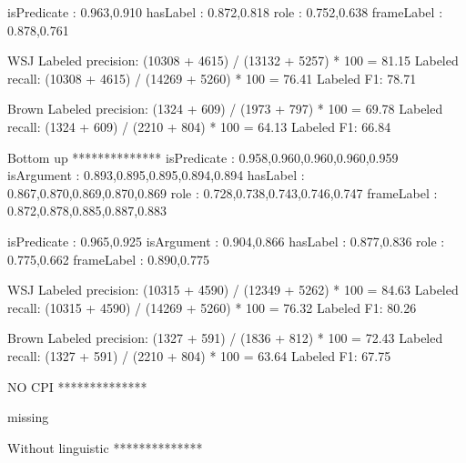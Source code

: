          isPredicate    : 0.963,0.910
            hasLabel    : 0.872,0.818
                role    : 0.752,0.638
          frameLabel    : 0.878,0.761

WSJ
  Labeled precision:          (10308 + 4615) / (13132 + 5257) * 100 = 81.15 %
  Labeled recall:             (10308 + 4615) / (14269 + 5260) * 100 = 76.41 %
  Labeled F1:                 78.71

Brown
  Labeled precision:          (1324 + 609) / (1973 + 797) * 100 = 69.78 %
  Labeled recall:             (1324 + 609) / (2210 + 804) * 100 = 64.13 %
  Labeled F1:                 66.84


Bottom up
**************
         isPredicate    : 0.958,0.960,0.960,0.960,0.959
          isArgument    : 0.893,0.895,0.895,0.894,0.894
            hasLabel    : 0.867,0.870,0.869,0.870,0.869
                role    : 0.728,0.738,0.743,0.746,0.747
          frameLabel    : 0.872,0.878,0.885,0.887,0.883

         isPredicate    : 0.965,0.925
          isArgument    : 0.904,0.866
            hasLabel    : 0.877,0.836
                role    : 0.775,0.662
          frameLabel    : 0.890,0.775

WSJ
  Labeled precision:          (10315 + 4590) / (12349 + 5262) * 100 = 84.63 %
  Labeled recall:             (10315 + 4590) / (14269 + 5260) * 100 = 76.32 %
  Labeled F1:                 80.26

Brown
  Labeled precision:          (1327 + 591) / (1836 + 812) * 100 = 72.43 %
  Labeled recall:             (1327 + 591) / (2210 + 804) * 100 = 63.64 %
  Labeled F1:                 67.75


NO CPI 
**************

missing


Without linguistic
**************

